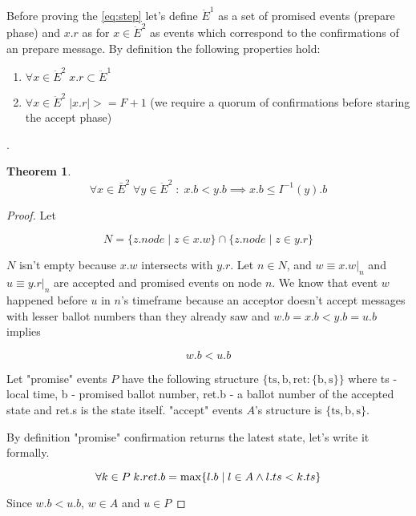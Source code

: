 \documentclass[12pt]{article}
\newtheorem{theorem}{Theorem}
\theoremstyle{definition}
\begin{document}
\begin{appendices}
Before proving the \ref{eq:step} let's define $\ddot{E}^1$ as a set of promised events (prepare phase) and $x.r$ as for $x \in \ddot{E}^2$ as events which correspond to the confirmations of an prepare message. By definition the following properties hold:
\begin{enumerate}
  \item $\forall x \in \ddot{E}^2 \; x.r \subset \ddot{E}^1$
  \item $\forall x \in \ddot{E}^2 \; |x.r| >= F+1$ (we require a quorum of confirmations before staring the accept phase)
\end{enumerate}.

\begin{theorem} \label{th:proof2}
  $$\forall x \in \bar{E}^2 \; \forall y \in \ddot{E}^2 \;:\; x.b < y.b \implies x.b \leq I^{-1}(y).b$$
\end{theorem}

\begin{proof}
  Let
  
  $$N = \{z.node \;|\; z \in x.w\} \cap \{z.node \;|\; z \in y.r\}$$

  $N$ isn't empty because $x.w$ intersects with $y.r$. Let $n \in N$, and $w \equiv x.w |_n$ and $u \equiv y.r |_n$ are accepted and promised events on node $n$. We know that event $w$ happened before $u$ in $n$'s timeframe because an acceptor doesn't accept messages with lesser ballot numbers than they already saw and $w.b = x.b < y.b = u.b$ implies

  \begin{equation}
    w.b < u.b
  \end{equation}

  Let "promise" events $P$ have the following structure $\{ \mbox{ts}, \mbox{b}, \mbox{ret} : \{ \mbox{b}, \mbox{s} \} \}$ where ts - local time, b - promised ballot number, ret.b - a ballot number of the accepted state and ret.s is the state itself. "accept" events $A$'s structure is  $\{ \mbox{ts}, \mbox{b}, \mbox{s} \}$.

  By definition "promise" confirmation returns the latest state, let's write it formally.

  \begin{equation} \label{eq:last}
    \forall k \in P \; k.ret.b = \max \{ l.b \;|\;l \in A \land l.ts < k.ts \} \\
  \end{equation}

  Since $w.b < u.b$, $w \in A$ and $u \in P$


\end{proof}
\end{appendices}
\end{document}
